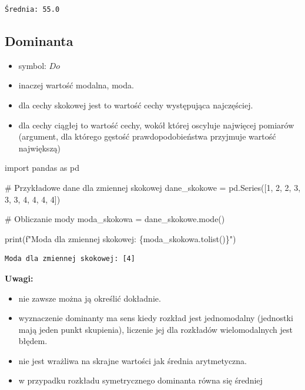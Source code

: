\documentclass[
  polish,
  letterpaper,
  DIV=11,
  numbers=noendperiod]{scrreprt}
\newenvironment{Shaded}{\begin{snugshade}}{\end{snugshade}}
\newcommand{\BuiltInTok}[1]{\textcolor[rgb]{0.00,0.23,0.31}{#1}}
\newcommand{\CommentTok}[1]{\textcolor[rgb]{0.37,0.37,0.37}{#1}}
\newcommand{\DecValTok}[1]{\textcolor[rgb]{0.68,0.00,0.00}{#1}}
\newcommand{\ImportTok}[1]{\textcolor[rgb]{0.00,0.46,0.62}{#1}}
\newcommand{\NormalTok}[1]{\textcolor[rgb]{0.00,0.23,0.31}{#1}}
\newcommand{\OperatorTok}[1]{\textcolor[rgb]{0.37,0.37,0.37}{#1}}
\newcommand{\SpecialCharTok}[1]{\textcolor[rgb]{0.37,0.37,0.37}{#1}}
\newcommand{\SpecialStringTok}[1]{\textcolor[rgb]{0.13,0.47,0.30}{#1}}
\providecommand{\tightlist}{%
  \setlength{\itemsep}{0pt}\setlength{\parskip}{0pt}}
\begin{document}
\begin{verbatim}
Średnia: 55.0
\end{verbatim}

\subsection{Dominanta}\label{dominanta}

\begin{itemize}
\tightlist
\item
  symbol: \(Do\)
\item
  inaczej wartość modalna, moda.
\item
  dla cechy skokowej jest to wartość cechy występująca najczęściej.
\item
  dla cechy ciągłej to wartość cechy, wokół której oscyluje najwięcej
  pomiarów (argument, dla którego gęstość prawdopodobieństwa przyjmuje
  wartość największą)
\end{itemize}

\begin{Shaded}
\begin{Highlighting}[]
\ImportTok{import}\NormalTok{ pandas }\ImportTok{as}\NormalTok{ pd}

\CommentTok{\# Przykładowe dane dla zmiennej skokowej}
\NormalTok{dane\_skokowe }\OperatorTok{=}\NormalTok{ pd.Series([}\DecValTok{1}\NormalTok{, }\DecValTok{2}\NormalTok{, }\DecValTok{2}\NormalTok{, }\DecValTok{3}\NormalTok{, }\DecValTok{3}\NormalTok{, }\DecValTok{3}\NormalTok{, }\DecValTok{4}\NormalTok{, }\DecValTok{4}\NormalTok{, }\DecValTok{4}\NormalTok{, }\DecValTok{4}\NormalTok{])}

\CommentTok{\# Obliczanie mody}
\NormalTok{moda\_skokowa }\OperatorTok{=}\NormalTok{ dane\_skokowe.mode()}

\BuiltInTok{print}\NormalTok{(}\SpecialStringTok{f"Moda dla zmiennej skokowej: }\SpecialCharTok{\{}\NormalTok{moda\_skokowa}\SpecialCharTok{.}\NormalTok{tolist()}\SpecialCharTok{\}}\SpecialStringTok{"}\NormalTok{)}
\end{Highlighting}
\end{Shaded}

\begin{verbatim}
Moda dla zmiennej skokowej: [4]
\end{verbatim}

\textbf{Uwagi:}

\begin{itemize}
\tightlist
\item
  nie zawsze można ją określić dokładnie.
\item
  wyznaczenie dominanty ma sens kiedy rozkład jest jednomodalny
  (jednostki mają jeden punkt skupienia), liczenie jej dla rozkładów
  wielomodalnych jest błędem.
\item
  nie jest wrażliwa na skrajne wartości jak średnia arytmetyczna.
\item
  w przypadku rozkładu symetrycznego dominanta równa się średniej
\end{itemize}
\end{document}
